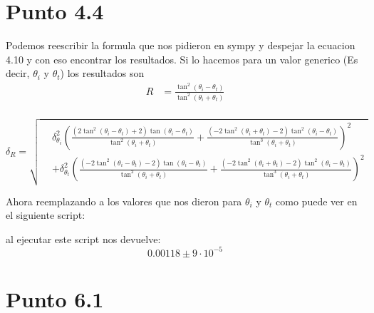 \documentclass[12pt]{exam}
\begin{document}
\section{Punto 4.4}

Podemos reescribir la formula que nos pidieron en sympy y despejar la ecuacion 4.10 y con eso encontrar los resultados. Si lo hacemos para un valor generico (Es decir, $\theta_i$ y $\theta_t$) los resultados son
\begin{align*}
  R &= \frac{\tan^{2}{\left(\theta_{i} - \theta_{t} \right)}}{\tan^{2}{\left(\theta_{i} + \theta_{t} \right)}}\\
\end{align*}

\[
\delta_R = \sqrt{
  \begin{aligned}
    &\delta_{\theta_i}^{2} \left(
      \frac{
        \left(2 \tan^{2}{\left(\theta_{i} - \theta_{t} \right)} + 2\right)
        \tan{\left(\theta_{i} - \theta_{t} \right)}
      }{
        \tan^{2}{\left(\theta_{i} + \theta_{t} \right)}
      } 
      + 
      \frac{
        \left(- 2 \tan^{2}{\left(\theta_{i} + \theta_{t} \right)} - 2\right)
        \tan^{2}{\left(\theta_{i} - \theta_{t} \right)}
      }{
        \tan^{3}{\left(\theta_{i} + \theta_{t} \right)}
      }
    \right)^{2}
    \\
    &+ \delta_{\theta_t}^{2} \left(
      \frac{
        \left(- 2 \tan^{2}{\left(\theta_{i} - \theta_{t} \right)} - 2\right)
        \tan{\left(\theta_{i} - \theta_{t} \right)}
      }{
        \tan^{2}{\left(\theta_{i} + \theta_{t} \right)}
      } 
      + 
      \frac{
        \left(- 2 \tan^{2}{\left(\theta_{i} + \theta_{t} \right)} - 2\right)
        \tan^{2}{\left(\theta_{i} - \theta_{t} \right)}
      }{
        \tan^{3}{\left(\theta_{i} + \theta_{t} \right)}
      }
    \right)^{2}
  \end{aligned}
}
\]

Ahora reemplazando a los valores que nos dieron para $\theta_i$ y $\theta_t$ como puede ver en el siguiente script:



al ejecutar este script nos devuelve:
\begin{equation*}
  0.00118 \pm 9 \cdot 10^{-5}
\end{equation*}

\section{Punto 6.1}
\end{document}
